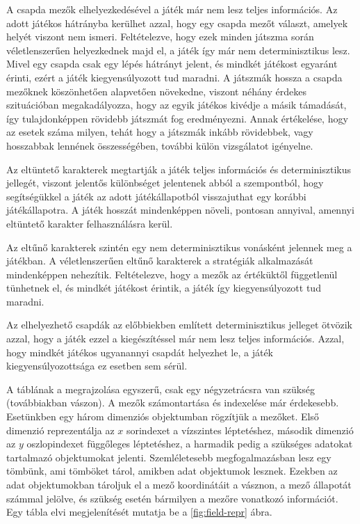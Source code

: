 A csapda mezők elhelyezkedésével a játék már nem lesz teljes információs. Az adott játékos hátrányba kerülhet azzal, hogy egy csapda mezőt választ, amelyek helyét viszont nem ismeri. Feltételezve, hogy ezek minden játszma során véletlenszerűen helyezkednek majd el, a játék így már nem determinisztikus lesz. Mivel egy csapda csak egy lépés hátrányt jelent, és mindkét játékost egyaránt érinti, ezért a játék kiegyensúlyozott tud maradni. A játszmák hossza a csapda mezőknek köszönhetően alapvetően növekedne, viszont néhány érdekes szituációban megakadályozza, hogy az egyik játékos kivédje a másik támadását, így tulajdonképpen rövidebb játszmát fog eredményezni. Annak értékelése, hogy az esetek száma milyen, tehát hogy a játszmák inkább rövidebbek, vagy hosszabbak lennének összességében, további külön vizsgálatot igényelne.

Az eltüntető karakterek megtartják a játék teljes információs és determinisztikus jellegét, viszont jelentős különbséget jelentenek abból a szempontból, hogy segítségükkel a játék az adott játékállapotból visszajuthat egy korábbi játékállapotra. A játék hosszát mindenképpen növeli, pontosan annyival, amennyi eltüntető karakter felhasználásra kerül.

Az eltűnő karakterek szintén egy nem determinisztikus vonásként jelennek meg a játékban. A véletlenszerűen eltűnő karakterek a stratégiák alkalmazását mindenképpen nehezítik. Feltételezve, hogy a mezők az értéküktől függetlenül tünhetnek el, és mindkét játékost érintik, a játék így kiegyensúlyozott tud maradni.

Az elhelyezhető csapdák az előbbiekben említett determinisztikus jelleget ötvözik azzal, hogy a játék ezzel a kiegészítéssel már nem lesz teljes információs. Azzal, hogy mindkét játékos ugyanannyi csapdát helyezhet le, a játék kiegyensúlyozottsága ez esetben sem sérül.

\label{board-repr}

A táblának a megrajzolása egyszerű, csak egy négyzetrácsra van szükség (továbbiakban vászon). A mezők számontartása és indexelése már érdekesebb. Esetünkben egy három dimenziós objektumban rögzítjük a mezőket. Első dimenzió reprezentálja az $x$ sorindexet a vízszintes léptetéshez, második dimenzió az $y$ oszlopindexet függőleges léptetéshez, a harmadik pedig a szükséges adatokat tartalmazó objektumokat jelenti. Szemléletesebb megfogalmazásban lesz egy tömbünk, ami tömböket tárol, amikben adat objektumok lesznek. Ezekben az adat objektumokban tároljuk el a mező koordinátáit a vásznon, a mező állapotát számmal jelölve, és szükség esetén bármilyen a mezőre vonatkozó információt. Egy tábla elvi megjelenítését mutatja be a \ref{fig:field-repr} ábra.

